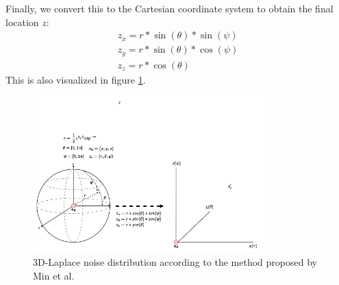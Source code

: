 Finally, we convert this to the Cartesian coordinate system to obtain the final location $z$:
\begin{align*}
  z_x = r * \sin(\theta) * \sin(\psi) \\
  z_y = r * \sin(\theta) * \cos(\psi) \\
  z_z = r * \cos(\theta)
\end{align*}
This is also visualized in figure \ref{fig:3d-laplace}.
\begin{figure}
  \includegraphics[width=0.8\textwidth]{TheorethicalFramework/ND-Laplace/Images/3d_laplace.png}
  \caption{3D-Laplace noise distribution according to the method proposed by Min et al. \citep{9646489}}
  \label{fig:3d-laplace}
\end{figure}
\newpage

